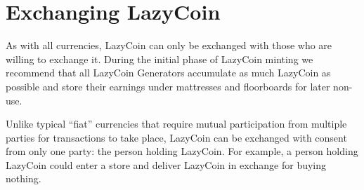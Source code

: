 \section{Exchanging LazyCoin}
As with all currencies, LazyCoin can only be exchanged with those who are willing to exchange it. During the initial phase of LazyCoin minting we recommend that all LazyCoin Generators accumulate as much LazyCoin as possible and store their earnings under mattresses and floorboards for later non-use.

Unlike typical ``fiat'' currencies that require mutual participation from multiple parties for transactions to take place, LazyCoin can be exchanged with consent from only one party: the person holding LazyCoin. For example, a person holding LazyCoin could enter a store and deliver LazyCoin in exchange for buying nothing.




